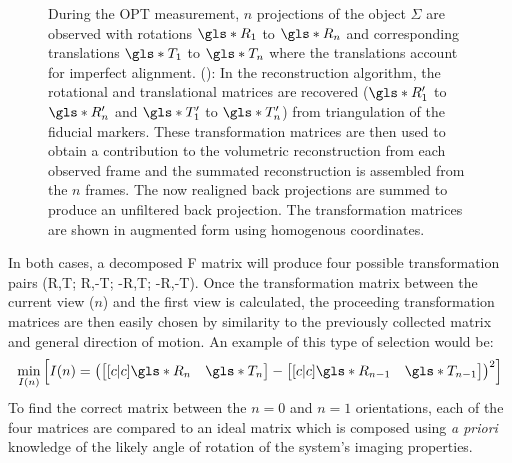 \documentclass{osa-article}
\begin{document}
\begin{figure}
{    During the OPT measurement, \(n\) projections of the object \(\Sigma \) are observed with rotations \(\gls*{R}_1\) to \(\gls*{R}_n\) and corresponding translations \(\gls*{T}_1\) to \(\gls*{T}_n\) where the translations account for imperfect alignment.
    (): In the reconstruction algorithm, the rotational and translational matrices are recovered (\(\gls*{R}_1'\) to \(\gls*{R}_n'\) and \(\gls*{T}_1'\) to \(\gls*{T}_n'\)) from triangulation of the fiducial markers.
    These transformation matrices are then used to obtain a contribution to the volumetric reconstruction from each observed frame and the summated reconstruction is assembled from the \(n\) frames.
    The now realigned back projections are summed to produce an unfiltered back projection.
    The transformation matrices are shown in augmented form using homogenous coordinates.
    }\label{fig:flopt_algorithm} %
\end{figure}


In both cases, a decomposed \gls*{F} matrix will produce four possible transformation pairs (\gls*{R},\gls*{T}; \gls*{R},-\gls*{T}; -\gls*{R},\gls*{T}; -\gls*{R},-\gls*{T}).
Once the transformation matrix between the current view (\(n\)) and the first view is calculated, the proceeding transformation matrices are then easily chosen by similarity to the previously collected matrix and general direction of motion.
An example of this type of selection would be:
\begin{align}
\min_{I(n)}\left[I(n) = \left(\begin{bmatrix}[c|c] \gls*{R}_n&\gls*{T}_n \end{bmatrix} - \begin{bmatrix}[c|c] \gls*{R}_{n-1}&\gls*{T}_{n-1} \end{bmatrix}\right)^2\right]
\end{align}
To find the correct matrix between the \(n=0\) and \(n=1\) orientations, each of the four matrices are compared to an ideal matrix which is composed using \emph{a priori} knowledge of the likely angle of rotation of the system's imaging properties.
\end{document}
